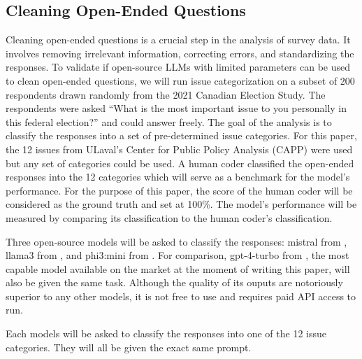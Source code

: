 \documentclass[
  authoryear,
  preprint,
  3p]{elsarticle}
\newenvironment{Shaded}{\begin{snugshade}}{\end{snugshade}}
\newcommand{\FunctionTok}[1]{\textcolor[rgb]{0.28,0.35,0.67}{#1}}
\newcommand{\NormalTok}[1]{\textcolor[rgb]{0.00,0.23,0.31}{#1}}
\newcommand{\OtherTok}[1]{\textcolor[rgb]{0.00,0.23,0.31}{#1}}
\newcommand{\SpecialCharTok}[1]{\textcolor[rgb]{0.37,0.37,0.37}{#1}}
\newcommand{\StringTok}[1]{\textcolor[rgb]{0.13,0.47,0.30}{#1}}
\begin{document}
\subsection{Cleaning Open-Ended
Questions}\label{cleaning-open-ended-questions}

Cleaning open-ended questions is a crucial step in the analysis of
survey data. It involves removing irrelevant information, correcting
errors, and standardizing the responses. To validate if open-source LLMs
with limited parameters can be used to clean open-ended questions, we
will run issue categorization on a subset of 200 respondents drawn
randomly from the 2021 Canadian Election Study. The respondents were
asked ``What is the most important issue to you personally in this
federal election?'' and could answer freely. The goal of the analysis is
to classify the responses into a set of pre-determined issue categories.
For this paper, the 12 issues from ULaval's Center for Public Policy
Analysis (CAPP) were used but any set of categories could be used. A
human coder classified the open-ended responses into the 12 categories
which will serve as a benchmark for the model's performance. For the
purpose of this paper, the score of the human coder will be considered
as the ground truth and set at 100\%. The model's performance will be
measured by comparing its classification to the human coder's
classification.

Three open-source models will be asked to classify the responses:
mistral from \citet{jiang_etal23}, llama3 from \citet{meta24}, and
phi3:mini from \citet{abdin_etal24}. For comparison, gpt-4-turbo from
\citet{openai23b}, the most capable model available on the market at the
moment of writing this paper, will also be given the same task. Although
the quality of its ouputs are notoriously superior to any other models,
it is not free to use and requires paid API access to run.

Each models will be asked to classify the responses into one of the 12
issue categories. They will all be given the exact same prompt.

\begin{Shaded}
\end{Shaded}
\end{document}
